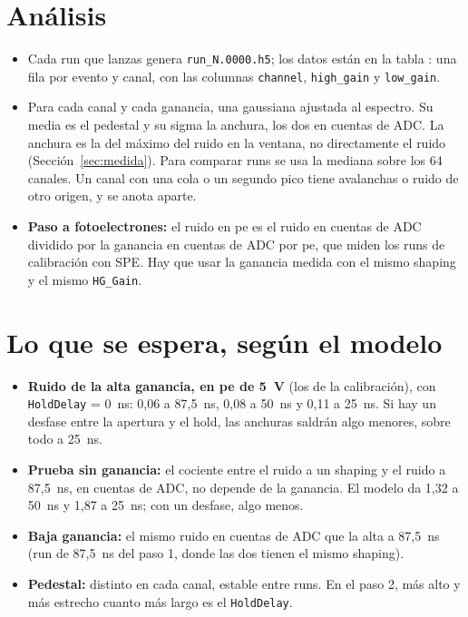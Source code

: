 \documentclass[11pt,a4paper]{article}
\begin{document}
\section{Análisis}
\label{sec:datos}

\begin{itemize}
\item \sloppy Cada run que lanzas genera \texttt{run\_N.0000.h5}; los datos están en la tabla
  : una fila por evento y canal,
  con las columnas \texttt{channel}, \texttt{high\_gain} y
  \texttt{low\_gain}.
\item Para cada canal y cada ganancia, una gaussiana ajustada al espectro.
  Su media es el pedestal y su sigma la anchura, los dos en cuentas de ADC.
  La anchura es la del máximo del ruido en la ventana, no directamente el
  ruido (Sección~\ref{sec:medida}).
  Para comparar runs se usa la mediana sobre los 64 canales. Un canal con
  una cola o un segundo pico tiene avalanchas o ruido de otro origen, y se
  anota aparte.
\item {\bf Paso a fotoelectrones:} el ruido en pe es el ruido en cuentas de
  ADC dividido por la ganancia en cuentas de ADC por pe, que miden los runs
  de calibración con SPE. Hay que usar la ganancia medida con el mismo
  shaping y el mismo \texttt{HG\_Gain}.
\end{itemize}

\section{Lo que se espera, según el modelo}

\begin{itemize}
\item {\bf Ruido de la alta ganancia, en pe de 5~V} (los de la calibración),
  con \texttt{HoldDelay} = 0~ns: 0,06 a 87,5~ns, 0,08 a 50~ns y 0,11 a
  25~ns. Si hay un desfase entre la apertura y el hold, las anchuras saldrán
  algo menores, sobre todo a 25~ns.
\item {\bf Prueba sin ganancia:} el cociente entre el ruido a un shaping y
  el ruido a 87,5~ns, en cuentas de ADC, no depende de la ganancia. El
  modelo da 1,32 a 50~ns y 1,87 a 25~ns; con un desfase, algo menos.
\item {\bf Baja ganancia:} el mismo ruido en cuentas de ADC que la alta a
  87,5~ns (run de 87,5~ns del paso 1, donde las dos tienen el mismo
  shaping).
\item {\bf Pedestal:} distinto en cada canal, estable entre runs. En el paso
  2, más alto y más estrecho cuanto más largo es el \texttt{HoldDelay}.
\end{itemize}
\end{document}
